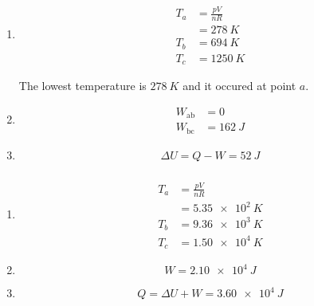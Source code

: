 \documentclass{article}
\begin{document}
\begin{enumerate}
  \item

        \begin{align*}
          T_a & = \frac{p V}{n R} \\
              & = \qty{278}{K}    \\
          T_b & = \qty{694}{K}    \\
          T_c & = \qty{1250}{K}
        \end{align*}

        The lowest temperature is $\qty{278}{K}$ and it occured at point $a$.

  \item

        \begin{align*}
          W_\text{ab} & = 0            \\
          W_\text{bc} & = \qty{162}{J}
        \end{align*}

  \item \[\Delta U = Q - W = \qty{52}{J}\]
\end{enumerate}

\setcounter{subsubsection}{12}
\subsubsection{}

\begin{enumerate}
  \item

        \begin{align*}
          T_a & = \frac{p V}{n R} \\
              & = \qty{5.35e2}{K} \\
          T_b & = \qty{9.36e3}{K} \\
          T_c & = \qty{1.50e4}{K}
        \end{align*}

  \item \[W = \qty{2.10e4}{J}\]

  \item \[Q = \Delta U + W = \qty{3.60e4}{J}\]
\end{enumerate}

\setcounter{subsubsection}{16}
\subsubsection{}
\end{document}
